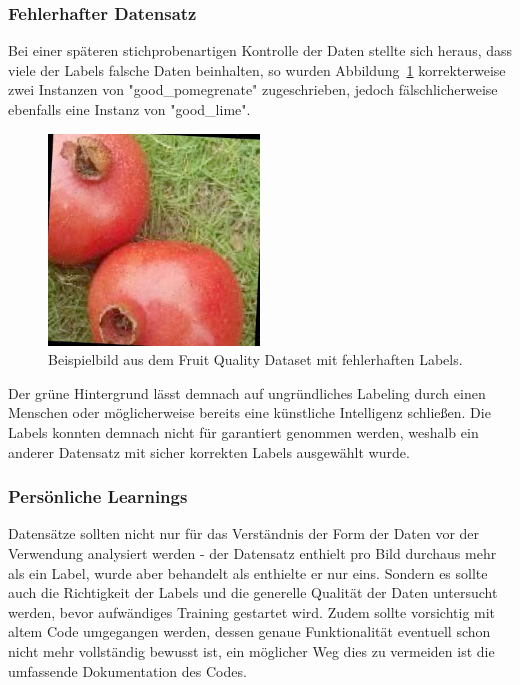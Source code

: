 \documentclass[runningheads]{llncs}
\begin{document}
\subsubsection{Fehlerhafter Datensatz} Bei einer späteren stichprobenartigen Kontrolle der Daten stellte sich heraus, dass viele der Labels falsche Daten beinhalten, so wurden Abbildung~\ref{fig1} korrekterweise zwei Instanzen von "good\_pomegrenate" zugeschrieben, jedoch fälschlicherweise ebenfalls eine Instanz von "good\_lime".

\begin{figure}[H]
    \centering
    \includegraphics[width=0.5\textwidth]{images/good_pomegrenate_good_lime_error.jpg}
    \caption{Beispielbild aus dem Fruit Quality Dataset mit fehlerhaften Labels.}
    \label{fig1}
\end{figure}

Der grüne Hintergrund lässt demnach auf ungründliches Labeling durch einen Menschen oder möglicherweise bereits eine künstliche Intelligenz schließen. Die Labels konnten demnach nicht für garantiert genommen werden, weshalb ein anderer Datensatz mit sicher korrekten Labels ausgewählt wurde.

\subsubsection{Persönliche Learnings} Datensätze sollten nicht nur für das Verständnis der Form der Daten vor der Verwendung analysiert werden - der Datensatz enthielt pro Bild durchaus mehr als ein Label, wurde aber behandelt als enthielte er nur eins. Sondern es sollte auch die Richtigkeit der Labels und die generelle Qualität der Daten untersucht werden, bevor aufwändiges Training gestartet wird. Zudem sollte vorsichtig mit altem Code umgegangen werden, dessen genaue Funktionalität eventuell schon nicht mehr vollständig bewusst ist, ein möglicher Weg dies zu vermeiden ist die umfassende Dokumentation des Codes.
\end{document}
